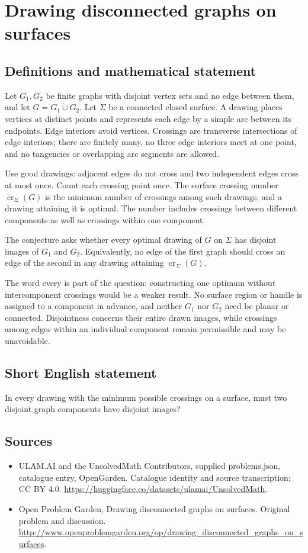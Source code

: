 \documentclass[11pt,a4paper]{article}
\begin{document}
\section*{Drawing disconnected graphs on surfaces}\label{statement}

\subsection{Definitions and mathematical statement}
Let $G_1,G_2$ be finite graphs with disjoint vertex sets and no edge between them, and let $G=G_1\mathbin{\dot\cup}G_2$. Let $\Sigma$ be a connected closed surface. A drawing places vertices at distinct points and represents each edge by a simple arc between its endpoints. Edge interiors avoid vertices. Crossings are transverse intersections of edge interiors; there are finitely many, no three edge interiors meet at one point, and no tangencies or overlapping arc segments are allowed.

Use good drawings: adjacent edges do not cross and two independent edges cross at most once. Count each crossing point once. The surface crossing number $\operatorname{cr}_\Sigma(G)$ is the minimum number of crossings among such drawings, and a drawing attaining it is optimal. The number includes crossings between different components as well as crossings within one component.

The conjecture asks whether every optimal drawing of $G$ on $\Sigma$ has disjoint images of $G_1$ and $G_2$. Equivalently, no edge of the first graph should cross an edge of the second in any drawing attaining $\operatorname{cr}_\Sigma(G)$.

The word every is part of the question: constructing one optimum without intercomponent crossings would be a weaker result. No surface region or handle is assigned to a component in advance, and neither $G_1$ nor $G_2$ need be planar or connected. Disjointness concerns their entire drawn images, while crossings among edges within an individual component remain permissible and may be unavoidable.
\subsection{Short English statement}
In every drawing with the minimum possible crossings on a surface, must two disjoint graph components have disjoint images?
\subsection{Sources}
\begin{itemize}
\item[S1] ULAM.AI and the UnsolvedMath Contributors, supplied problems.json, catalogue entry, OpenGarden. Catalogue identity and source transcription; CC BY 4.0.
\url{https://huggingface.co/datasets/ulamai/UnsolvedMath}.
\item[S2] Open Problem Garden, Drawing disconnected graphs on surfaces. Original problem and discussion.
\url{http://www.openproblemgarden.org/op/drawing_disconnected_graphs_on_surfaces}.
\end{itemize}
\end{document}
